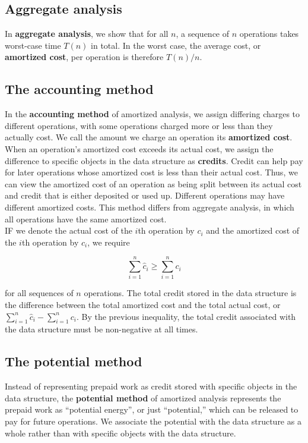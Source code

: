 \documentclass[12pt]{article}
\begin{document}
\subsection{Aggregate analysis}

In \textbf{aggregate analysis}, we show that for all $n$, a sequence of $n$ operations takes worst-case time $T(n)$ in total. In the worst case, the average cost, or \textbf{amortized cost}, per operation is therefore $T(n)/n$.

\subsection{The accounting method}

In the \textbf{accounting method} of amortized analysis, we assign differing charges to different operations, with some operations charged more or less than they actually cost. We call the amount we charge an operation its \textbf{amortized cost}. When an operation's amortized cost exceeds its actual cost, we assign the difference to specific objects in the data structure as \textbf{credits}. Credit can help pay for later operations whose amortized cost is less than their actual cost. Thus, we can view the amortized cost of an operation as being split between its actual cost and credit that is either deposited or used up. Different operations may have different amortized costs. This method differs from aggregate analysis, in which all operations have the same amortized cost. \\

IF we denote the actual cost of the $i$th operation by $c_i$ and the amortized cost of the $i$th operation by $\hat{c}_i$, we require

\begin{equation*}
  \sum_{i=1}^{n} \hat{c}_i \ge \sum_{i=1}^n c_i
\end{equation*}

for all sequences of $n$ operations. The total credit stored in the data structure is the difference between the total amortized cost and the total actual cost, or $\sum_{i=1}^{n} \hat{c}_i - \sum_{i=1}^n c_i$. By the previous inequality, the total credit associated with the data structure must be non-negative at all times. 

\subsection{The potential method}

Instead of representing prepaid work as credit stored with specific objects in the data structure, the \textbf{potential method} of amortized analysis represents the prepaid work as ``potential energy'', or just ``potential,'' which can be released to pay for future operations. We associate the potential with the data structure as a whole rather than with specific objects with the data structure. \\
\end{document}
